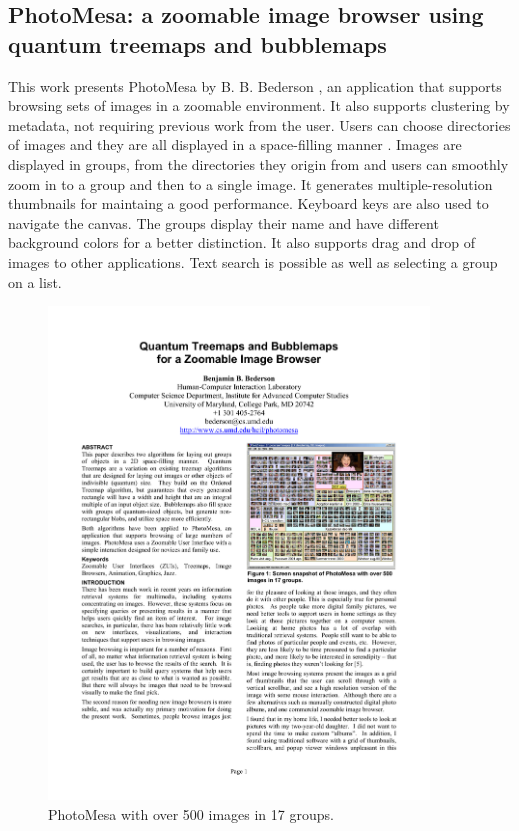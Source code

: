 \subsection{PhotoMesa: a zoomable image browser using quantum treemaps and bubblemaps}
\label{sub:PhotoMesa}

This work presents PhotoMesa by B. B. Bederson \cite{Bederson:2001:PZI:502348.502359}, an application that supports browsing sets of images in a zoomable environment. It also supports clustering by metadata, not requiring previous work from the user. Users can choose directories of images and they are all displayed in a space-filling manner . Images are displayed in groups, from the directories they origin from and users can smoothly zoom in to a group and then to a single image. It generates multiple-resolution thumbnails for maintaing a good performance. Keyboard keys are also used to navigate the canvas. The groups display their name and have different background colors for a better distinction. It also supports drag and drop of images to other applications. Text search is possible as well as selecting a group on a list.

\begin{figure}[ht!]
	\centering
		\includegraphics[width=0.90\textwidth]{imgs-RelatedWork/PhotoMesa.pdf}
	\caption{PhotoMesa with over 500 images in 17 groups.}
	\label{fig:photomesa}
\end{figure}

